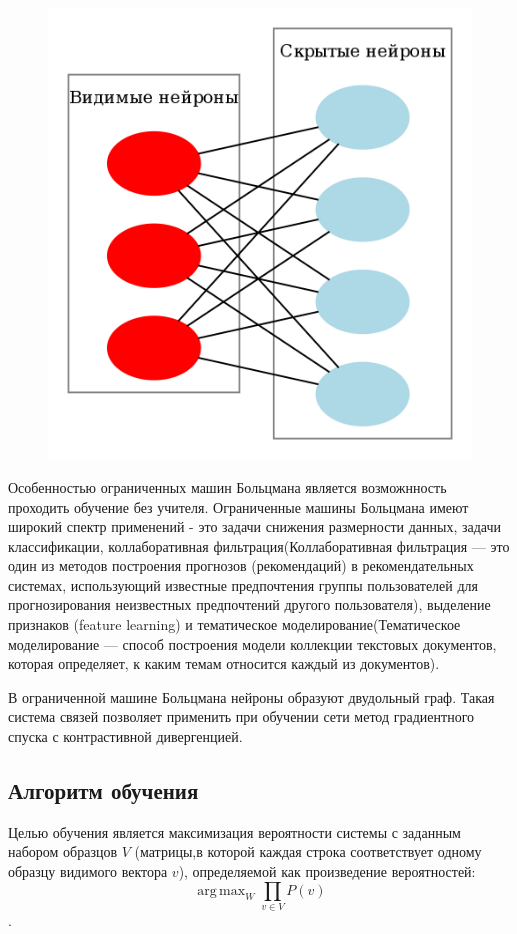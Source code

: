 \documentclass[paper=a4, fontsize=11pt]{scrartcl} %
\numberwithin{equation}{section} %
\numberwithin{figure}{section} %
\numberwithin{table}{section} %
\DeclareMathOperator*{\argmax}{arg\,max}
\begin{document}
	\begin{figure}[h!]
		\centering
		\includegraphics[scale=0.18]{Restricted_Boltzmann_machine}
	\end{figure}
	
	Особенностью ограниченных машин Больцмана является возможнность проходить обучение без учителя.
	Ограниченные машины Больцмана имеют широкий спектр применений - это задачи снижения размерности данных, задачи классификации, коллаборативная фильтрация(Коллаборативная фильтрация — это один из методов построения прогнозов (рекомендаций) в рекомендательных системах, использующий известные предпочтения группы пользователей для прогнозирования неизвестных предпочтений другого пользователя), выделение признаков (feature learning) и тематическое моделирование(Тематическое моделирование — способ построения модели коллекции текстовых документов, которая определяет, к каким темам относится каждый из документов).
	
	В ограниченной машине Больцмана нейроны образуют двудольный граф. Такая система связей позволяет применить при обучении сети метод градиентного спуска с контрастивной дивергенцией.
	
	\subsection{Алгоритм обучения}
	Целью обучения является максимизация вероятности системы с заданным набором образцов $V$ (матрицы,в которой каждая строка соответствует одному образцу видимого вектора $v$), определяемой как произведение вероятностей: $$\argmax_W \prod\limits_{v \in V} P(v)$$.
	
\end{document}
